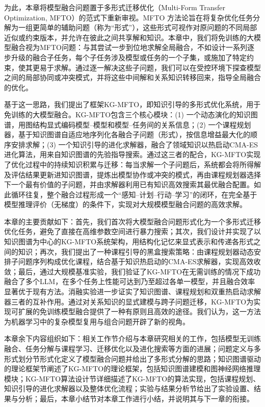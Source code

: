 \documentclass[../main.tex]{subfiles}
\begin{document}
为此，本章将模型融合问题置于多形式迁移优化（Multi-Form Transfer Optimization, MFTO）的范式下重新审视。MFTO 方法论旨在将复杂优化任务分解为一组更简单的辅助问题（称为“形式”），这些形式可视作对原问题的不同局部近似或约束版本，并允许在彼此之间共享解和知识。本章中，我们将免训练的大模型融合视为MFTO问题：与其尝试一步到位地求解全局融合，不如设计一系列逐步升级的融合子任务，每个子任务涉及模型或任务的一个子集，或施加了特定约束，使其更易于求解。通过逐一解决这些子问题，我们可以在受控环境下探查模型之间的局部协同或冲突模式，并将这些中间解和关系知识转移回来，指导全局融合的优化。

基于这一思路，我们提出了框架KG-MFTO，即知识引导的多形式优化系统，用于免训练的大模型融合。KG-MFTO包含三个核心模块：(1) 一个动态演化的知识图谱，用图结构显式编码模型–模型和模型–任务间的关系信息；(2) 一个课程规划器，基于知识图谱自适应地序列化各融合子问题（形式），按信息增益最大化的顺序安排求解；(3) 一个知识引导的进化求解器，融合了领域知识以热启动CMA-ES进化算法，用来自知识图谱的先验指导搜索。通过这三者的配合，KG-MFTO实现了优化过程中的持续知识积累与迁移：每当求解一个子问题后，系统都会将所得解及评估结果更新进知识图谱，提炼出模型协作或冲突的模式，再由课程规划器选择下一个最有价值的子问题，并由求解器利用已有知识高效搜索其最优融合配置。如此循环往复，整个融合过程形成一个“感知–计划–行动–学习”的闭环，在完全基于模型推理评价（无梯度）的条件下，实现对大规模模型融合问题的高效求解。

本章的主要贡献如下：首先，我们首次将大模型融合问题形式化为一个多形式迁移优化任务，避免了直接在高维参数空间进行暴力搜索；其次，我们设计并实现了以知识图谱为中心的KG-MFTO系统架构，用结构化记忆来显式表示和传递各形式之间的知识；再次，我们提出了一种课程引导的黑盒搜索策略：由课程规划器动态安排子问题序列构成优化课程，结合基于知识热启动的CMA-ES求解器，实现高效收敛；最后，通过大规模基准实验，我们验证了KG-MFTO在无需训练的情况下成功融合了多个LLM，在多个任务上性能可达到乃至超过各单一模型，并且融合效率显著优于现有方法。消融实验进一步证实了知识图谱、课程规划和双重热启动求解器三者的互补作用。通过对关系知识的显式建模与跨子问题迁移，KG-MFTO为实现可扩展的免训练模型融合提供了一种有原则且高效的途径。我们认为，这一方法为机器学习中的复杂模型复用与组合问题开辟了新的视角。

本章余下内容组织如下：相关工作节介绍与本章研究相关的工作，包括模型无训练融合、任务分解与课程学习、迁移优化以及进化搜索等方面的进展；问题定义与多形式划分节形式化定义了模型融合问题并给出了多形式分解的思路；知识图谱驱动的理论框架节阐述了KG-MFTO的理论框架，包括知识图谱建模和图神经网络推理模块；KG-MFTO算法设计节详细描述了KG-MFTO的算法实现，包括课程规划、知识引导的进化求解器以及整体优化流程；实验与结果分析节给出了实验设置、结果与分析；最后，本章小结节对本章工作进行小结，并说明其与下一章的衔接。
\end{document}
